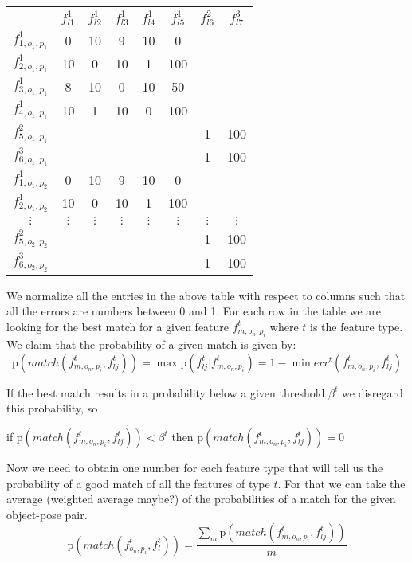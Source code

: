 \documentclass[11pt]{article}
\newcommand{\prob}[1]{\text{p}(#1)} %
\begin{document}
	\begin{table}[h]
			\centering
			\begin{tabular}{c|c c c c c c c} %
				& $f_{l1}^1$ & $f_{l2}^1$ & $f_{l3}^1$ & $f_{l4}^1$ & $f_{l5}^1$ & $f_{l6}^2$ & $f_{l7}^3$ \\
				\hline 	    %
				$f_{1,o_1,p_1}^1$ 	& 0 	& 10 	& 9 	& 10	& 0 	&  	&  		\\
				$f_{2,o_1,p_1}^1$ 	& 10 	& 0 	& 10	& 1		& 100 	&  	& 			\\
				$f_{3,o_1,p_1}^1$ 	& 8 	& 10 	& 0 	& 10	& 50 	&  	& 	\\
				$f_{4,o_1,p_1}^1$ 	& 10	& 1 	& 10	& 0 	& 100	&  	&    \\
				$f_{5,o_1,p_1}^2$ 	& &  	& & 	& 	& 1 	& 100	\\
				$f_{6,o_1,p_1}^3$ 	& &  	& & & 	& 1 	& 100	 \\
				$f_{1,o_1,p_2}^1$ 	& 0 	& 10 	& 9 	& 10	& 0 	&  	&  		\\
				$f_{2,o_1,p_2}^1$ 	& 10 	& 0 	& 10	& 1		& 100 	&  	& 		\\
				$\vdots$	 & $\vdots$	 & $\vdots$	 & $\vdots$	 & $\vdots$	 & $\vdots$	 & $\vdots$	 &$\vdots$	\\
				$f_{5,o_2,p_2}^2$ 	& &  	& & 	& 	& 1 	& 100	\\
				$f_{6,o_2,p_2}^3$ 	& &  	& & & 	& 1 	& 100	 	 	
			\end{tabular}
			\label{tab:experimentErrors}
		\end{table}
		
		We normalize all the entries in the above table with respect to columns such that all the errors are numbers between 0 and 1.
		For each row in the table we are looking for the best match for a given feature $f_{m,o_n,p_i}^t$ where $t$ is the feature type. We claim that the probability of a given match is given by:
		\[
	\prob{match(f^t_{m,o_n,p_i},f^t_{lj})} = \max \prob{f^t_{lj}|f^t_{m,o_n,p_i}} = 1-  \min err^t(f^t_{m,o_n,p_i},f^t_{lj})
		\]

	If the best match results in a probability below a given threshold $\beta^t$ we disregard this probability, so

	if $ \prob{match(f^t_{m,o_n,p_i},f^t_{lj})}<\beta^t$ then $\prob{match(f^t_{m,o_n,p_i},f^t_{lj})} = 0$

	Now we need to obtain one number for each feature type that will tell us the probability of a good match of all the features of type $t$. For that we can take the average (weighted average maybe?) of the probabilities of a match for the given object-pose pair.
	\[
	\prob{match(f^t_{o_n,p_i},f^t_{l})} = \frac{\sum\limits_m \prob{match(f^t_{m,o_n,p_i},f^t_{lj})}} {m}
	\]
\end{document}
